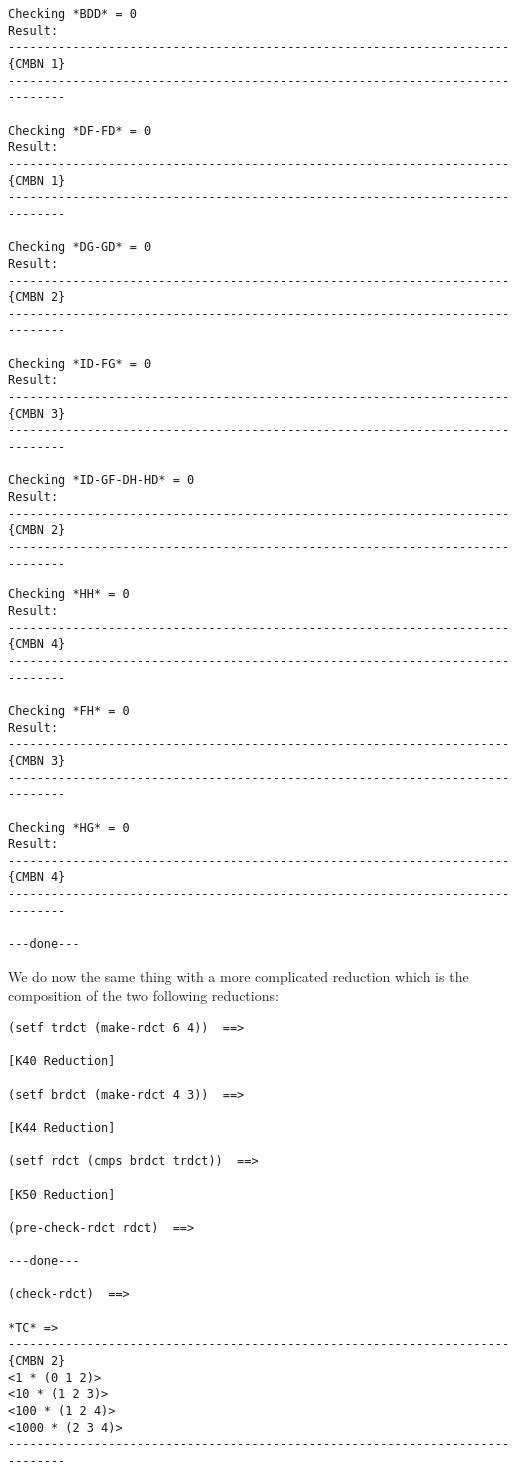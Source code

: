 {\begin{verbatim}
Checking *BDD* = 0
Result: 
----------------------------------------------------------------------{CMBN 1}
------------------------------------------------------------------------------

Checking *DF-FD* = 0
Result: 
----------------------------------------------------------------------{CMBN 1}
------------------------------------------------------------------------------

Checking *DG-GD* = 0
Result: 
----------------------------------------------------------------------{CMBN 2}
------------------------------------------------------------------------------

Checking *ID-FG* = 0
Result: 
----------------------------------------------------------------------{CMBN 3}
------------------------------------------------------------------------------

Checking *ID-GF-DH-HD* = 0
Result: 
----------------------------------------------------------------------{CMBN 2}
------------------------------------------------------------------------------
\end{verbatim}}
\newpage
{\footnotesize\begin{verbatim}
Checking *HH* = 0
Result: 
----------------------------------------------------------------------{CMBN 4}
------------------------------------------------------------------------------

Checking *FH* = 0
Result: 
----------------------------------------------------------------------{CMBN 3}
------------------------------------------------------------------------------

Checking *HG* = 0
Result: 
----------------------------------------------------------------------{CMBN 4}
------------------------------------------------------------------------------

---done---
\end{verbatim}}
We do now the same thing with a more complicated reduction which is the
composition of the two following reductions:
{\footnotesize\begin{verbatim}
(setf trdct (make-rdct 6 4))  ==>

[K40 Reduction]

(setf brdct (make-rdct 4 3))  ==>

[K44 Reduction]

(setf rdct (cmps brdct trdct))  ==>

[K50 Reduction]

(pre-check-rdct rdct)  ==>

---done---

(check-rdct)  ==>

*TC* => 
----------------------------------------------------------------------{CMBN 2}
<1 * (0 1 2)>
<10 * (1 2 3)>
<100 * (1 2 4)>
<1000 * (2 3 4)>
------------------------------------------------------------------------------
\end{verbatim}}
